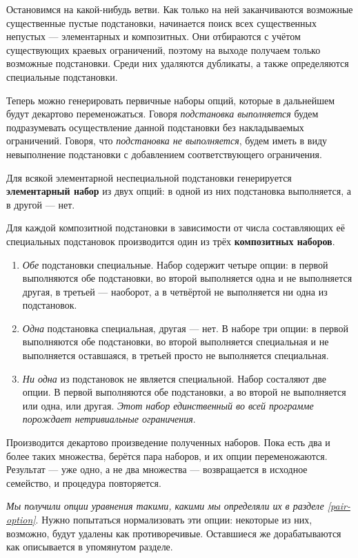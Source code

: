 \documentclass[12pt]{article}
\begin{document}
Остановимся на какой-нибудь ветви. Как только на ней заканчиваются возможные
существенные пустые подстановки, начинается поиск всех существенных непустых
--- элементарных и композитных. Они отбираются с учётом существующих краевых
ограничений, поэтому на выходе получаем только возможные подстановки. Среди
них удаляются дубликаты, а также определяются специальные подстановки.

Теперь можно генерировать первичные наборы опций, которые в дальнейшем будут
декартово переменожаться. Говоря \textit{подстановка выполняется} будем
подразумевать осуществление данной подстановки без накладываемых ограничений.
Говоря, что \textit{подстановка не выполняется}, будем иметь в виду невыполнение
подстановки с добавлением соответствующего ограничения.

Для всякой элементарной неспециальной подстановки генерируется
\textbf{элементарный набор} из двух опций: в одной из них подстановка
выполняется, а в другой --- нет.

Для каждой композитной подстановки в зависимости от числа составляющих её
специальных подстановок производится один из трёх \textbf{композитных наборов}.
\begin{enumerate}
  \item \textit{Обе} подстановки специальные. Набор содержит четыре опции:
  в первой выполняются обе подстановки, во второй выполняется одна и не
  выполняется другая, в третьей --- наоборот, а в четвёртой не выполняется
  ни одна из подстановок.
  
\item \textit{Одна} подстановка специальная, другая --- нет. В наборе
  три опции: в первой выполняются обе подстановки, во второй выполняется
  специальная и не выполняется оставшаяся, в третьей просто не выполняется
  специальная.
    
\item \textit{Ни одна} из подстановок не является специальной. Набор
  состаляют две опции. В первой выполняются обе подстановки, а во второй не
  выполняется или одна, или другая. \textit{Этот набор единственный во
  всей программе порождает нетривиальные ограничения}.
\end{enumerate}

Производится декартово произведение полученных наборов. Пока есть два и более
таких множества, берётся пара наборов, и их опции переменожаются. Результат
--- уже одно, а не два множества --- возвращается в исходное семейство, и
процедура повторяется.

\textit{Мы получили опции уравнения такими, какими мы определяли их в разделе
\emph{\ref{pair-option}}}. Нужно попытаться нормализовать эти опции: некоторые
из них, возможно, будут удалены как противоречивые. Оставшиеся же
дорабатываются как описывается в упомянутом разделе.
\end{document}
